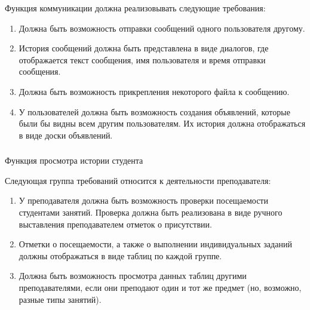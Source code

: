 Функция коммуникации должна реализовывать следующие требования:

\begin{enumerate}
	\item Должна быть возможность отправки сообщений одного пользователя другому.
	\item История сообщений должна быть представлена в виде диалогов, где отображается текст сообщения, имя пользователя и время отправки сообщения.
	\item Должна быть возможность прикрепления некоторого файла к сообщению.
	\item У пользователей должна быть возможность создания объявлений, которые были бы видны всем другим пользователям. Их история должна отображаться в виде доски объявлений.
\end{enumerate}

\subsubsection{} Функция просмотра истории студента
\label{sec:domain:specification:student_history}

Следующая группа требований относится к деятельности преподавателя:

\begin{enumerate}
	\item У преподавателя должна быть возможность проверки посещаемости студентами занятий. Проверка должна быть реализована в виде ручного выставления преподавателем отметок о присутствии.
	\item Отметки о посещаемости, а также о выполнении индивидуальных заданий должны отображаться в виде таблиц по каждой группе. 
	\item Должна быть возможность просмотра данных таблиц другими преподавателями, если они преподают один и тот же предмет (но, возможно, разные типы занятий).
\end{enumerate}

